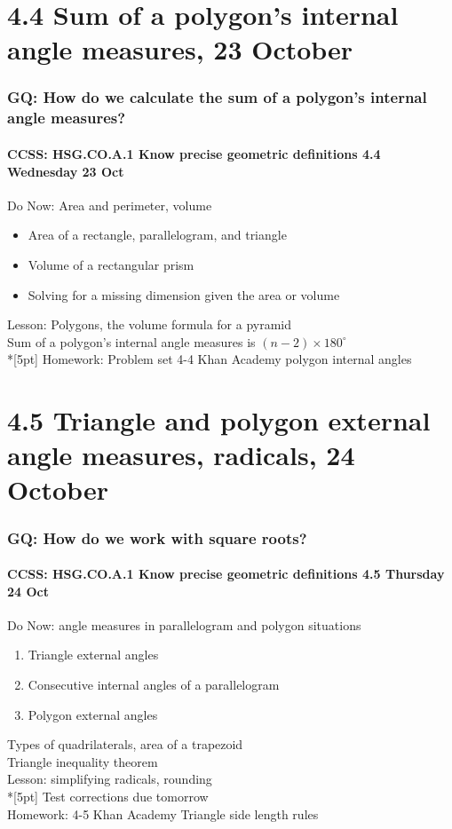 \documentclass{beamer}
\begin{document}
  \section{4.4 Sum of a polygon's internal angle measures, 23 October}
  \frame
  {
    \frametitle{GQ: How do we calculate the sum of a polygon's internal angle measures?}
    \framesubtitle{CCSS: HSG.CO.A.1 Know precise geometric definitions \hfill \alert{4.4 Wednesday 23 Oct}}
  
    \begin{block}{Do Now: Area and perimeter, volume}
    \begin{itemize}
      \item Area of a rectangle, parallelogram, and triangle
      \item Volume of a rectangular prism
      \item Solving for a missing dimension given the area or volume
    \end{itemize}
    \end{block}
    Lesson: Polygons, the volume formula for a pyramid \\
    Sum of a polygon's internal angle measures is $(n-2) \times 180^\circ$ \\*[5pt]
    Homework: Problem set 4-4 Khan Academy polygon internal angles
  }

  \section{4.5 Triangle and polygon external angle measures, radicals, 24 October}
  \frame
  {
    \frametitle{GQ: How do we work with square roots?}
    \framesubtitle{CCSS: HSG.CO.A.1 Know precise geometric definitions \hfill \alert{4.5 Thursday 24 Oct}}
  
    \begin{block}{Do Now: angle measures in parallelogram and polygon situations}
    \begin{enumerate}
      \item Triangle external angles
      \item Consecutive internal angles of a parallelogram
      \item Polygon external angles
    \end{enumerate}
    \end{block}
    Types of quadrilaterals, area of a trapezoid \\
    Triangle inequality theorem \\
    Lesson: simplifying radicals, rounding \\*[5pt]
    Test corrections due \alert{tomorrow} \\
    Homework: 4-5 Khan Academy Triangle side length rules
  }
\end{document}

